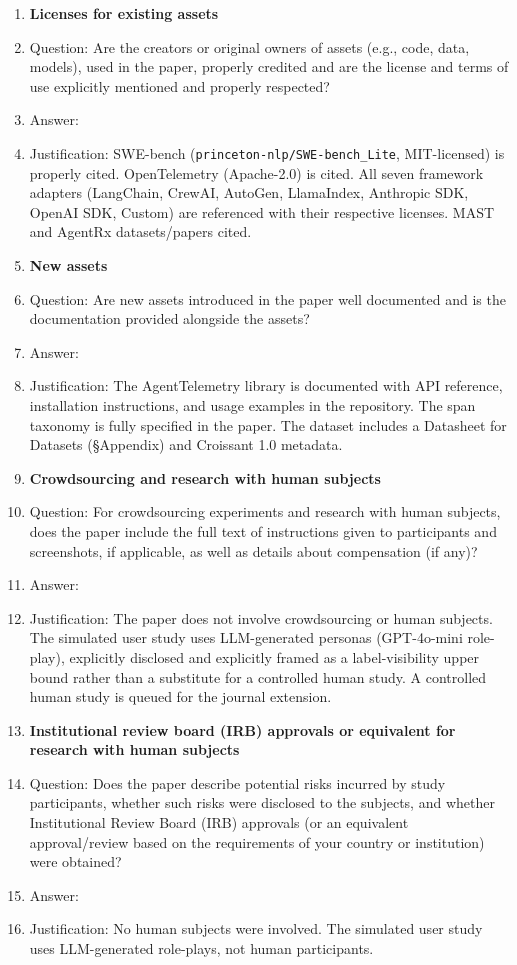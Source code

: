 \begin{enumerate}
\item {\bf Licenses for existing assets}
    \item[] Question: Are the creators or original owners of assets (e.g., code, data, models), used in the paper, properly credited and are the license and terms of use explicitly mentioned and properly respected?
    \item[] Answer: \answerYes{}
    \item[] Justification: SWE-bench (\texttt{princeton-nlp/SWE-bench\_Lite}, MIT-licensed) is properly cited. OpenTelemetry (Apache-2.0) is cited. All seven framework adapters (LangChain, CrewAI, AutoGen, LlamaIndex, Anthropic SDK, OpenAI SDK, Custom) are referenced with their respective licenses. MAST and AgentRx datasets/papers cited.

\item {\bf New assets}
    \item[] Question: Are new assets introduced in the paper well documented and is the documentation provided alongside the assets?
    \item[] Answer: \answerYes{}
    \item[] Justification: The AgentTelemetry library is documented with API reference, installation instructions, and usage examples in the repository. The span taxonomy is fully specified in the paper. The dataset includes a Datasheet for Datasets (\S Appendix) and Croissant 1.0 metadata.

\item {\bf Crowdsourcing and research with human subjects}
    \item[] Question: For crowdsourcing experiments and research with human subjects, does the paper include the full text of instructions given to participants and screenshots, if applicable, as well as details about compensation (if any)?
    \item[] Answer: \answerNA{}
    \item[] Justification: The paper does not involve crowdsourcing or human subjects. The simulated user study uses LLM-generated personas (GPT-4o-mini role-play), explicitly disclosed and explicitly framed as a label-visibility upper bound rather than a substitute for a controlled human study. A controlled human study is queued for the journal extension.

\item {\bf Institutional review board (IRB) approvals or equivalent for research with human subjects}
    \item[] Question: Does the paper describe potential risks incurred by study participants, whether such risks were disclosed to the subjects, and whether Institutional Review Board (IRB) approvals (or an equivalent approval/review based on the requirements of your country or institution) were obtained?
    \item[] Answer: \answerNA{}
    \item[] Justification: No human subjects were involved. The simulated user study uses LLM-generated role-plays, not human participants.


\end{enumerate}
